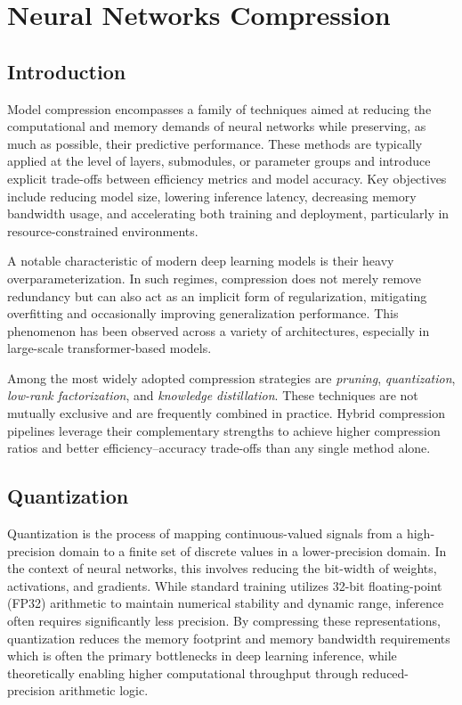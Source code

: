 \chapter{Neural Networks Compression}
\label{chap:compression}
\section{Introduction}
Model compression encompasses a family of techniques aimed at reducing the computational and memory demands of neural networks while preserving, as much as possible, their predictive performance. These methods are typically applied at the level of layers, submodules, or parameter groups and introduce explicit trade-offs between efficiency metrics and model accuracy. Key objectives include reducing model size, lowering inference latency, decreasing memory bandwidth usage, and accelerating both training and deployment, particularly in resource-constrained environments.

A notable characteristic of modern deep learning models is their heavy overparameterization. In such regimes, compression does not merely remove redundancy but can also act as an implicit form of regularization, mitigating overfitting and occasionally improving generalization performance. This phenomenon has been observed across a variety of architectures, especially in large-scale transformer-based models.

Among the most widely adopted compression strategies are \emph{pruning}, \emph{quantization}, \emph{low-rank factorization}, and \emph{knowledge distillation}. These techniques are not mutually exclusive and are frequently combined in practice. Hybrid compression pipelines leverage their complementary strengths to achieve higher compression ratios and better efficiency–accuracy trade-offs than any single method alone.

\section{Quantization}

Quantization is the process of mapping continuous-valued signals from a high-precision domain to a finite set of discrete values in a lower-precision domain. In the context of neural networks, this involves reducing the bit-width of weights, activations, and gradients. While standard training utilizes 32-bit floating-point (FP32) arithmetic to maintain numerical stability and dynamic range, inference often requires significantly less precision. By compressing these representations, quantization reduces the memory footprint and memory bandwidth requirements which is often the primary bottlenecks in deep learning inference, while theoretically enabling higher computational throughput through reduced-precision arithmetic logic.


